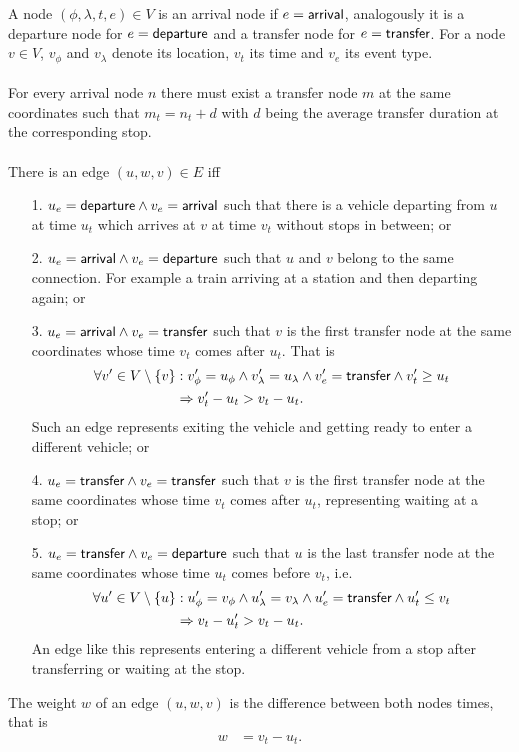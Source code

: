 \begin{mydef}
		A node $(\phi, \lambda, t, e) \in V$ is an \textnormal{arrival node} if $e = \textsf{arrival}$, analogously it is a
		\textnormal{departure node} for $e = \textsf{departure}$ and a transfer node for $e = \textsf{transfer}$.
		For a node $v \in V$, $v_\phi$ and $v_\lambda$ denote its location, $v_t$ its time and $v_e$ its event type.\\\\
		For every arrival node $n$ there must exist a transfer node $m$ at the same coordinates such that $m_t = n_t + d$
		with $d$ being the average transfer duration at the corresponding stop.\\\\
		There is an edge $(u, w, v) \in E$ iff
		\begin{itemize}
			\item[1.] $u_e = \textsf{departure} \land v_e = \textsf{arrival}$ such that there is a vehicle departing
				from $u$ at time $u_t$ which arrives at $v$ at time $v_t$ without stops in between; or
			\item[2.] $u_e = \textsf{arrival} \land v_e = \textsf{departure}$
				such that $u$ and $v$ belong to the same connection. For example a train arriving at a station
				and then departing again; or
			\item[3.] $u_e = \textsf{arrival} \land v_e = \textsf{transfer}$
				such that $v$ is the first transfer node at the same coordinates whose time $v_t$ comes after $u_t$. That is
				\begin{align*}
					\forall v' \in V \setminus \{v\}	&: v'_\phi = u_\phi \land v'_\lambda = u_\lambda \land v'_e = \textsf{transfer} \land v'_t \ge u_t\\
										&\Rightarrow v'_t - u_t > v_t - u_t.
				\end{align*}
				Such an edge represents exiting the vehicle and getting ready to enter a different vehicle; or
			\item[4.] $u_e = \textsf{transfer} \land v_e = \textsf{transfer}$
				such that $v$ is the first transfer node at the same coordinates whose time $v_t$ comes after $u_t$,
				representing waiting at a stop; or
			\item[5.] $u_e = \textsf{transfer} \land v_e = \textsf{departure}$
				such that $u$ is the last transfer node at the same coordinates whose time $u_t$ comes before $v_t$, i.e.
				\begin{align*}
					\forall u' \in V \setminus \{u\}	&: u'_\phi = v_\phi \land u'_\lambda = v_\lambda \land u'_e = \textsf{transfer} \land u'_t \le v_t\\
										&\Rightarrow v_t - u'_t > v_t - u_t.
				\end{align*}
				An edge like this represents entering a different vehicle from a stop after transferring or waiting at the stop.
		\end{itemize}
		The weight $w$ of an edge $(u, w, v)$ is the difference between both nodes times, that is
		\begin{align*}
			w	&= v_t - u_t.
		\end{align*}
	\end{mydef}
